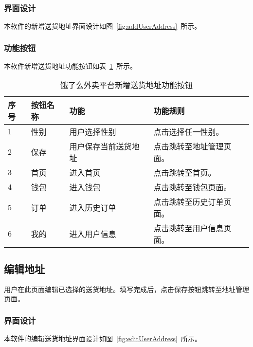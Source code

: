 \subsubsection{界面设计}
本软件的新增送货地址界面设计如图~\ref{fig:addUserAddress}~所示。
\subsubsection{功能按钮}
本软件新增送货地址功能按钮如表~\ref{tab:table14}~所示。
\begin{table}[htbp]
    \caption{饿了么外卖平台新增送货地址功能按钮}\label{tab:table14}
    \vspace{0.5em}\wuhao
    \begin{tabularx}{\textwidth}{lllX}
    \toprule[1.5pt]
    序号 & 按钮名称 & 功能 & 功能规则 \\ 
    \midrule[1pt]
    1 & 性别 & 用户选择性别 & 点击选择任一性别。 \\
    2 & 保存 & 用户保存当前送货地址 & 点击跳转至地址管理页面。 \\
    3 & 首页 & 进入首页 & 点击跳转至首页。 \\
    4 & 钱包 & 进入钱包 & 点击跳转至钱包页面。 \\
    5 & 订单 & 进入历史订单 & 点击跳转至历史订单页面。 \\
    6 & 我的 & 进入用户信息 & 点击跳转至用户信息页面。 \\
\bottomrule[1.5pt]
\end{tabularx}
\vspace{\baselineskip}
\end{table}

\subsection{编辑地址}
用户在此页面编辑已选择的送货地址。填写完成后，点击保存按钮跳转至地址管理页面。
\subsubsection{界面设计}
本软件的编辑送货地址界面设计如图~\ref{fig:editUserAddress}~所示。

